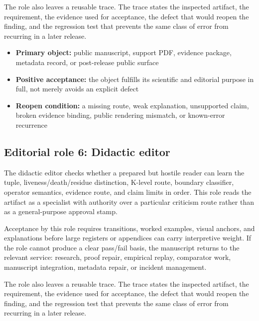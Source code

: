 The role also leaves a reusable trace. The trace states the inspected artifact, the requirement, the evidence used for acceptance, the defect that would reopen the finding, and the regression test that prevents the same class of error from recurring in a later release.


\begin{itemize}[leftmargin=1.8em]

\item \textbf{Primary object:} public manuscript, support PDF, evidence package, metadata record, or post-release public surface

\item \textbf{Positive acceptance:} the object fulfills its scientific and editorial purpose in full, not merely avoids an explicit defect

\item \textbf{Reopen condition:} a missing route, weak explanation, unsupported claim, broken evidence binding, public rendering mismatch, or known-error recurrence

\end{itemize}

\subsection{Editorial role 6: Didactic editor}

The didactic editor checks whether a prepared but hostile reader can learn the tuple, liveness/death/residue distinction, K-level route, boundary classifier, operator semantics, evidence route, and claim limits in order. This role reads the artifact as a specialist with authority over a particular criticism route rather than as a general-purpose approval stamp.


Acceptance by this role requires transitions, worked examples, visual anchors, and explanations before large registers or appendices can carry interpretive weight. If the role cannot produce a clear pass/fail basis, the manuscript returns to the relevant service: research, proof repair, empirical replay, comparator work, manuscript integration, metadata repair, or incident management.


The role also leaves a reusable trace. The trace states the inspected artifact, the requirement, the evidence used for acceptance, the defect that would reopen the finding, and the regression test that prevents the same class of error from recurring in a later release.


